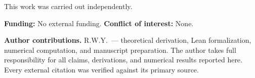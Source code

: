 \documentclass[aps,prd,preprint,superscriptaddress,nofootinbib,amsmath,amssymb,floatfix]{revtex4-2}
\makeatletter
\DeclareRobustCommand{\_}{%
    \ifmmode\nfss@text{\textunderscore}\else\textunderscore\penalty\z@\fi}%
\makeatother
\begin{document}
\begin{acknowledgments}
This work was carried out independently.

\textbf{Funding:} No external funding. \textbf{Conflict of interest:} None.

\textbf{Author contributions.} R.W.Y.\ --- theoretical derivation, Lean formalization, numerical computation, and manuscript preparation. The author takes full responsibility for all claims, derivations, and numerical results reported here. Every external citation was verified against its primary source.
\end{acknowledgments}




\newpage
\appendix

\end{document}
